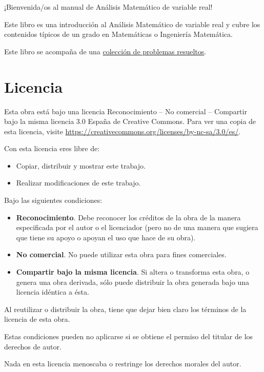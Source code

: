\documentclass[
  a4paper,
]{scrreport}
\providecommand{\tightlist}{%
  \setlength{\itemsep}{0pt}\setlength{\parskip}{0pt}}\usepackage{longtable,booktabs,array}
\theoremstyle{definition}
\theoremstyle{plain}
\theoremstyle{definition}
\theoremstyle{plain}
\theoremstyle{plain}
\theoremstyle{remark}
\begin{document}
¡Bienvenida/os al manual de Análisis Matemático de variable real!

Este libro es una introducción al Análisis Matemático de variable real y
cubre los contenidos típicos de un grado en Matemáticas o Ingeniería
Matemática.

Este libro se acompaña de una
\href{https://aprendeconalf.es/analisis-ejercicios/}{colección de
problemas resueltos}.

\hypertarget{licencia}{%
\section*{Licencia}\label{licencia}}

Esta obra está bajo una licencia Reconocimiento -- No comercial --
Compartir bajo la misma licencia 3.0 España de Creative Commons. Para
ver una copia de esta licencia, visite
\url{https://creativecommons.org/licenses/by-nc-sa/3.0/es/}.

Con esta licencia eres libre de:

\begin{itemize}
\tightlist
\item
  Copiar, distribuir y mostrar este trabajo.
\item
  Realizar modificaciones de este trabajo.
\end{itemize}

Bajo las siguientes condiciones:

\begin{itemize}
\item
  \textbf{Reconocimiento}. Debe reconocer los créditos de la obra de la
  manera especificada por el autor o el licenciador (pero no de una
  manera que sugiera que tiene su apoyo o apoyan el uso que hace de su
  obra).
\item
  \textbf{No comercial}. No puede utilizar esta obra para fines
  comerciales.
\item
  \textbf{Compartir bajo la misma licencia}. Si altera o transforma esta
  obra, o genera una obra derivada, sólo puede distribuir la obra
  generada bajo una licencia idéntica a ésta.
\end{itemize}

Al reutilizar o distribuir la obra, tiene que dejar bien claro los
términos de la licencia de esta obra.

Estas condiciones pueden no aplicarse si se obtiene el permiso del
titular de los derechos de autor.

Nada en esta licencia menoscaba o restringe los derechos morales del
autor.
\end{document}
